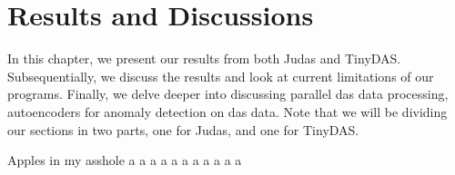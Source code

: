 \chapter{Results and Discussions}
\label{chap:results}

In this chapter, we present our results from both Judas and TinyDAS. Subsequentially, we discuss the results and look at current limitations of our programs. Finally, we delve deeper into discussing parallel \acrshort{das} data processing, autoencoders for anomaly detection on \acrshort{das} data. Note that we will be dividing our sections in two parts, one for Judas, and one for TinyDAS.






Apples in my asshole \cite{projthesis}
a \cite{claerbout1991scrutiny}
a \cite{landes1951scrutiny}
a \cite{omar2013machine}
a \cite{wei2022lstmautoencoder}
a \cite{julia}
a \cite{apSensing2019railwaydas}
a \cite{DBLP:journals/corr/SrivastavaMS15}
a \cite{2011ndongsigprocandet}
a \cite{doi:10.1137/141000671}
a \cite{bioengineering10040405}
a \cite{maulik2020recurrent}








